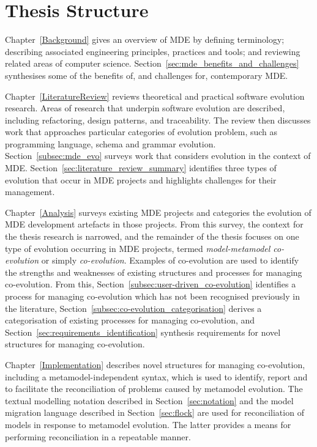 
\section{Thesis Structure}
Chapter~\ref{Background} gives an overview of MDE by defining terminology; describing associated engineering principles, practices and tools; and reviewing related areas of computer science. Section~\ref{sec:mde_benefits_and_challenges} synthesises some of the benefits of, and challenges for, contemporary MDE.

Chapter~\ref{LiteratureReview} reviews theoretical and practical software evolution research. Areas of research that underpin software evolution are described, including refactoring, design patterns, and traceability. The review then discusses work that approaches particular categories of evolution problem, such as programming language, schema and grammar evolution. Section~\ref{subsec:mde_evo} surveys work that considers evolution in the context of MDE. Section~\ref{sec:literature_review_summary} identifies three types of evolution that occur in MDE projects and highlights challenges for their management.

Chapter~\ref{Analysis} surveys existing MDE projects and categories the evolution of MDE development artefacts in those projects. From this survey, the context for the thesis research is narrowed, and the remainder of the thesis focuses on one type of evolution occurring in MDE projects, termed \emph{model-metamodel co-evolution} or simply \emph{co-evolution}. Examples of co-evolution are used to identify the strengths and weaknesses of existing structures and processes for managing co-evolution. From this, Section~\ref{subsec:user-driven_co-evolution} identifies a process for managing co-evolution which has not been recognised previously in the literature, Section~\ref{subsec:co-evolution_categorisation} derives a categorisation of existing processes for managing co-evolution, and Section~\ref{sec:requirements_identification} synthesis requirements for novel structures for managing co-evolution.

Chapter~\ref{Implementation} describes novel structures for managing co-evolution, including a metamodel-independent syntax, which is used to identify, report and to facilitate the reconciliation of problems caused by metamodel evolution. The textual modelling notation described in Section~\ref{sec:notation} and the model migration language described in Section~\ref{sec:flock} are used for reconciliation of models in response to metamodel evolution. The latter provides a means for performing reconciliation in a repeatable manner.

